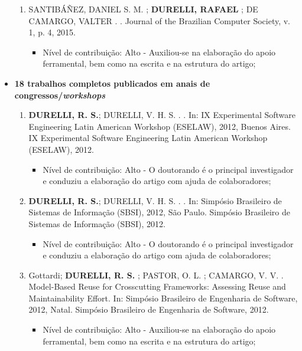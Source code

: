 \begin{itemize}
\begin{enumerate}
			\item SANTIBÁÑEZ, DANIEL S. M. ; \textbf{DURELLI, RAFAEL} ; DE CAMARGO, VALTER . . Journal of the Brazilian Computer Society, v. 1, p. 4, 2015.
			  \begin{itemize}
			        \item Nível de contribuição: Alto - Auxiliou-se na elaboração do apoio ferramental, bem como na escrita e na estrutura do artigo;
			    \end{itemize}
		\end{enumerate}
	\item \textbf{18 trabalhos completos publicados em anais de congressos/\textit{workshops}}
	\begin{enumerate}
	    
	    \item \textbf{DURELLI, R. S.}; DURELLI, V. H. S. . . In: IX Experimental Software Engineering Latin American Workshop (ESELAW), 2012, Buenos Aires. IX Experimental Software Engineering Latin American Workshop (ESELAW), 2012.
	            \begin{itemize}
			        \item Nível de contribuição: Alto - O doutorando é o principal investigador e conduziu a elaboração do artigo com ajuda de colaboradores;
			    \end{itemize}
	 	
	 	\item \textbf{DURELLI, R. S.}; DURELLI, V. H. S. . . In: Simpósio Brasileiro de Sistemas de Informação (SBSI), 2012, São Paulo. Simpósio Brasileiro de Sistemas de Informação (SBSI), 2012.
	 	        \begin{itemize}
			        \item Nível de contribuição: Alto - O doutorando é o principal investigador e conduziu a elaboração do artigo com ajuda de colaboradores;
			    \end{itemize}
	 	
	 	
	 	\item Gottardi; \textbf{DURELLI, R. S.} ; PASTOR, O. L. ; CAMARGO, V. V. . Model-Based Reuse for Crosscutting Frameworks: Assessing Reuse and Maintainability Effort. In: Simpósio Brasileiro de Engenharia de Software, 2012, Natal. Simpósio Brasileiro de Engenharia de Software, 2012.
	 	     \begin{itemize}
			        \item Nível de contribuição: Alto - Auxiliou-se na elaboração do apoio ferramental, bem como na escrita e na estrutura do artigo;
			    \end{itemize}
	 	

\end{enumerate}
\end{itemize}

